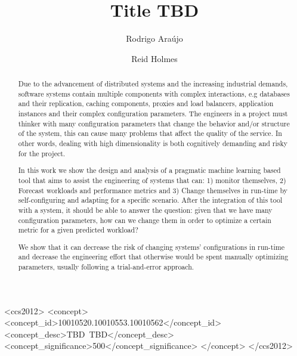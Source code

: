 \documentclass[sigconf]{acmart}
\begin{document}
\title{Title TBD}


\author{Rodrigo Araújo}

\author{Reid Holmes}

\renewcommand{\shortauthors}{B. Trovato et al.}


\begin{abstract}
Due to the advancement of distributed systems and the increasing industrial demands, software systems contain multiple components with complex interactions, e.g databases and their replication, caching components, proxies and load balancers, application instances and their complex configuration parameters. The engineers in a project must thinker with many configuration parameters that change the behavior and/or structure of the system, this can cause many problems that affect the quality of the service. In other words, dealing with high dimensionality is both cognitively demanding and risky for the project.

In this work we show the design and analysis of a pragmatic machine learning based tool that aims to assist the engineering of systems that can: 1) monitor themselves, 2) Forecast workloads and performance metrics and 3) Change themselves in run-time by self-configuring and adapting for a specific scenario. After the integration of this tool with a system, it should be able to answer the question: given that we have many configuration parameters, how can we change them in order to optimize a certain metric for a given predicted workload?

We show that it can decrease the risk of changing systems' configurations in run-time and decrease the engineering effort that otherwise would be spent manually optimizing parameters, usually following a trial-and-error approach.

\end{abstract}

%
%
\begin{CCSXML}
<ccs2012>
 <concept>
  <concept_id>10010520.10010553.10010562</concept_id>
  <concept_desc>TBD~TBD</concept_desc>
  <concept_significance>500</concept_significance>
 </concept>
</ccs2012>  
\end{CCSXML}





\maketitle




 
\end{document}
